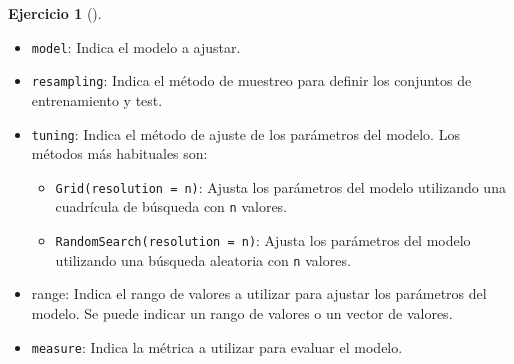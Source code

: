 \documentclass[
  a4paper,
]{scrreport}
\providecommand{\tightlist}{%
  \setlength{\itemsep}{0pt}\setlength{\parskip}{0pt}}\usepackage{longtable,booktabs,array}
\theoremstyle{definition}
\newtheorem{exercise}{Ejercicio}[chapter]
\theoremstyle{remark}
\begin{document}
\begin{exercise}[]
\begin{enumerate}
\begin{tcolorbox}
  \begin{itemize}
  \tightlist
  \item
    \texttt{model}: Indica el modelo a ajustar.
  \item
    \texttt{resampling}: Indica el método de muestreo para definir los
    conjuntos de entrenamiento y test.
  \item
    \texttt{tuning}: Indica el método de ajuste de los parámetros del
    modelo. Los métodos más habituales son:

    \begin{itemize}
    \tightlist
    \item
      \texttt{Grid(resolution\ =\ n)}: Ajusta los parámetros del modelo
      utilizando una cuadrícula de búsqueda con \texttt{n} valores.
    \item
      \texttt{RandomSearch(resolution\ =\ n)}: Ajusta los parámetros del
      modelo utilizando una búsqueda aleatoria con \texttt{n} valores.
    \end{itemize}
  \item
    range: Indica el rango de valores a utilizar para ajustar los
    parámetros del modelo. Se puede indicar un rango de valores o un
    vector de valores.
  \item
    \texttt{measure}: Indica la métrica a utilizar para evaluar el
    modelo.
  \end{itemize}

  \end{tcolorbox}

  \begin{tcolorbox}[enhanced jigsaw, toptitle=1mm, breakable, toprule=.15mm, opacitybacktitle=0.6, coltitle=black, titlerule=0mm, arc=.35mm, title=\textcolor{quarto-callout-tip-color}{\faLightbulb}\hspace{0.5em}{Solución}, rightrule=.15mm, opacityback=0, colback=white, bottomrule=.15mm, leftrule=.75mm, colbacktitle=quarto-callout-tip-color!10!white, bottomtitle=1mm, colframe=quarto-callout-tip-color-frame, left=2mm]


\end{tcolorbox}
\end{enumerate}
\end{exercise}
\end{document}
